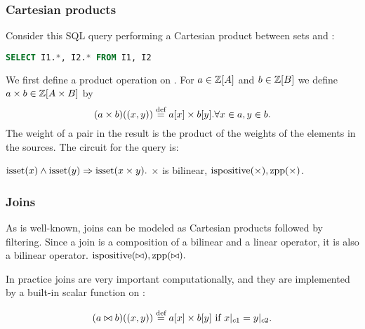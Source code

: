 \subsubsection{Cartesian products}

Consider this SQL query performing a Cartesian product
between sets  and :

\begin{lstlisting}[language=SQL]
SELECT I1.*, I2.* FROM I1, I2
\end{lstlisting}

We first define a product operation on \zrs.
For $a \in \mathbb{Z}[A]$ and $b \in \mathbb{Z}[B]$ we define $a \times b \in \mathbb{Z}[A \times B]$ by
$$(a \times b)((x,y)) \stackrel{\textrm{\scriptsize def}}{=} a[x] \times b[y] . \forall x \in a, y \in b.$$
The weight of a pair in the result is the product of the weights of the 
elements in the sources.  The circuit for the query is:

\begin{center}
\end{center}

$\mbox{isset}(x) \land \mbox{isset}(y) \Rightarrow \mbox{isset}(x \times y).$
$\times$ is bilinear, $\mbox{ispositive}(\times), \mbox{zpp}(\times)$.

\subsubsection{Joins}

As is well-known, joins can be modeled as Cartesian products
followed by filtering.  Since a join is a composition of a bilinear 
and a linear operator, it is also a bilinear operator.
$\mbox{ispositive}(\bowtie), \mbox{zpp}(\bowtie).$

In practice joins are very important computationally, and they are
implemented by a built-in scalar function on \zrs:

$$(a \bowtie b)((x,y)) \stackrel{\textrm{\scriptsize def}}{=} a[x] \times b[y] \mbox{ if } x|_{c1} = y|_{c2}.$$

\begin{center}
\end{center}

